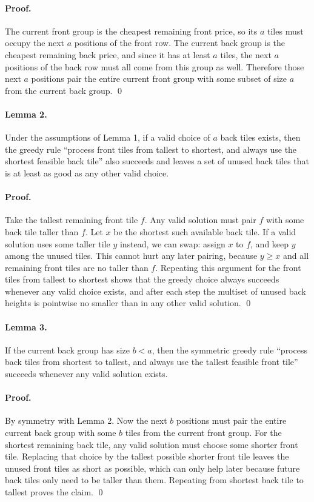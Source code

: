 \documentclass[11pt]{article}
\begin{document}
\paragraph{Proof.}
The current front group is the cheapest remaining front price, so its $a$ tiles must occupy the next $a$ positions of the front row. The current back group is the cheapest remaining back price, and since it has at least $a$ tiles, the next $a$ positions of the back row must all come from this group as well. Therefore those next $a$ positions pair the entire current front group with some subset of size $a$ from the current back group. \qed

\paragraph{Lemma 2.}
Under the assumptions of Lemma 1, if a valid choice of $a$ back tiles exists, then the greedy rule ``process front tiles from tallest to shortest, and always use the shortest feasible back tile'' also succeeds and leaves a set of unused back tiles that is at least as good as any other valid choice.

\paragraph{Proof.}
Take the tallest remaining front tile $f$. Any valid solution must pair $f$ with some back tile taller than $f$. Let $x$ be the shortest such available back tile. If a valid solution uses some taller tile $y$ instead, we can swap: assign $x$ to $f$, and keep $y$ among the unused tiles. This cannot hurt any later pairing, because $y \ge x$ and all remaining front tiles are no taller than $f$. Repeating this argument for the front tiles from tallest to shortest shows that the greedy choice always succeeds whenever any valid choice exists, and after each step the multiset of unused back heights is pointwise no smaller than in any other valid solution. \qed

\paragraph{Lemma 3.}
If the current back group has size $b < a$, then the symmetric greedy rule ``process back tiles from shortest to tallest, and always use the tallest feasible front tile'' succeeds whenever any valid solution exists.

\paragraph{Proof.}
By symmetry with Lemma 2. Now the next $b$ positions must pair the entire current back group with some $b$ tiles from the current front group. For the shortest remaining back tile, any valid solution must choose some shorter front tile. Replacing that choice by the tallest possible shorter front tile leaves the unused front tiles as short as possible, which can only help later because future back tiles only need to be taller than them. Repeating from shortest back tile to tallest proves the claim. \qed
\end{document}

